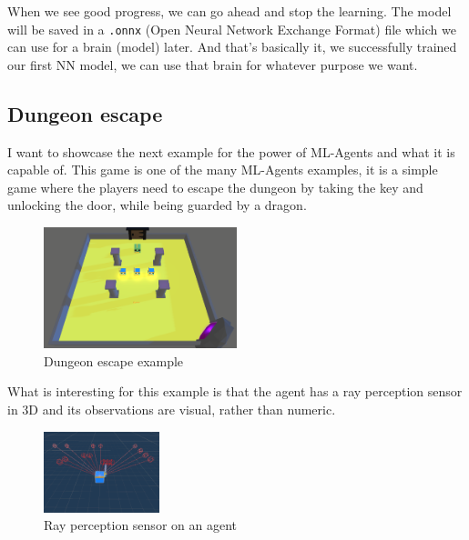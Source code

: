 \documentclass[a4paper, 12pt]{book}
\begin{document}
When we see good progress, we can go ahead and stop the learning. The model will be saved in a \texttt{.onnx} (Open Neural Network Exchange Format) file which we can use for a brain (model) later. And that's basically it, we successfully trained our first NN model, we can use that brain for whatever purpose we want.

\subsection{Dungeon escape}

I want to showcase the next example for the power of ML-Agents and what it is capable of. This game is one of the many ML-Agents \cite{MLAgents} examples, it is a simple game where the players need to escape the dungeon by taking the key and unlocking the door, while being guarded by a dragon.

\begin{figure}[h]
\begin{center}
\includegraphics[width=0.5\textwidth]{Images/DungeonEscape.png}
\end{center}
\caption{Dungeon escape example}
\label{pic11}
\end{figure}

What is interesting for this example is that the agent has a ray perception sensor in 3D and its observations are visual, rather than numeric.

\begin{figure}[h]
\begin{center}
\includegraphics[width=0.3\textwidth]{Images/AgentDungeonEscape.png}
\end{center}
\caption{Ray perception sensor on an agent}
\label{pic12}
\end{figure}
\end{document}
